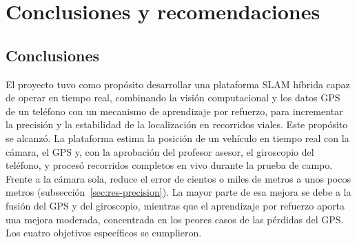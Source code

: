 
\chapter{Conclusiones y recomendaciones}
\label{ch:conclusiones}

\section{Conclusiones}

El proyecto tuvo como propósito desarrollar una plataforma SLAM híbrida capaz de operar en tiempo real, combinando la visión computacional y los datos GPS de un teléfono con un mecanismo de aprendizaje por refuerzo, para incrementar la precisión y la estabilidad de la localización en recorridos viales.
Este propósito se alcanzó.
La plataforma estima la posición de un vehículo en tiempo real con la cámara, el GPS y, con la aprobación del profesor asesor, el giroscopio del teléfono, y procesó recorridos completos en vivo durante la prueba de campo.
Frente a la cámara sola, reduce el error de cientos o miles de metros a unos pocos metros (subsección~\ref{sec:res-precision}).
La mayor parte de esa mejora se debe a la fusión del GPS y del giroscopio, mientras que el aprendizaje por refuerzo aporta una mejora moderada, concentrada en los peores casos de las pérdidas del GPS.
Los cuatro objetivos específicos se cumplieron.

